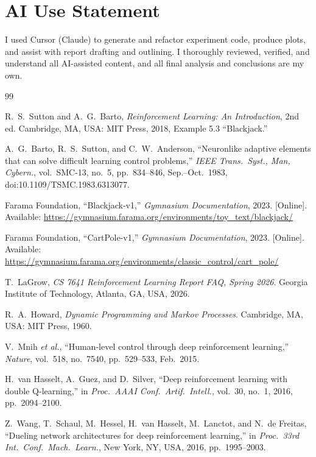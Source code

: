 \documentclass[conference]{IEEEtran}
\begin{document}
\section*{AI Use Statement}
I used Cursor (Claude) to generate and refactor experiment code, produce
plots, and assist with report drafting and outlining. I thoroughly reviewed,
verified, and understand all AI-assisted content, and all final analysis and
conclusions are my own.


\begin{thebibliography}{99}

R.~S.~Sutton and A.~G.~Barto,
\emph{Reinforcement Learning: An Introduction}, 2nd ed.
Cambridge, MA, USA: MIT Press, 2018, Example 5.3 ``Blackjack.''

A.~G.~Barto, R.~S.~Sutton, and C.~W.~Anderson,
``Neuronlike adaptive elements that can solve difficult learning control
problems,''
\emph{IEEE Trans.\ Syst., Man, Cybern.}, vol.~SMC-13, no.~5,
pp.~834--846, Sep.--Oct.\ 1983, doi:10.1109/TSMC.1983.6313077.

Farama Foundation,
``Blackjack-v1,'' \emph{Gymnasium Documentation}, 2023. [Online]. Available:
\url{https://gymnasium.farama.org/environments/toy_text/blackjack/}

Farama Foundation,
``CartPole-v1,'' \emph{Gymnasium Documentation}, 2023. [Online]. Available:
\url{https://gymnasium.farama.org/environments/classic_control/cart_pole/}

T.~LaGrow,
\emph{CS 7641 Reinforcement Learning Report FAQ, Spring 2026}.
Georgia Institute of Technology, Atlanta, GA, USA, 2026.

R.~A.~Howard,
\emph{Dynamic Programming and Markov Processes}.
Cambridge, MA, USA: MIT Press, 1960.

V.~Mnih \emph{et al.},
``Human-level control through deep reinforcement learning,''
\emph{Nature}, vol.~518, no.~7540, pp.~529--533, Feb.\ 2015.

H.~van Hasselt, A.~Guez, and D.~Silver,
``Deep reinforcement learning with double Q-learning,''
in \emph{Proc.\ AAAI Conf.\ Artif.\ Intell.}, vol.~30, no.~1, 2016,
pp.~2094--2100.

Z.~Wang, T.~Schaul, M.~Hessel, H.~van Hasselt, M.~Lanctot, and N.~de Freitas,
``Dueling network architectures for deep reinforcement learning,''
in \emph{Proc.\ 33rd Int.\ Conf.\ Mach.\ Learn.}, New York, NY, USA,
2016, pp.~1995--2003.


\end{thebibliography}
\end{document}
